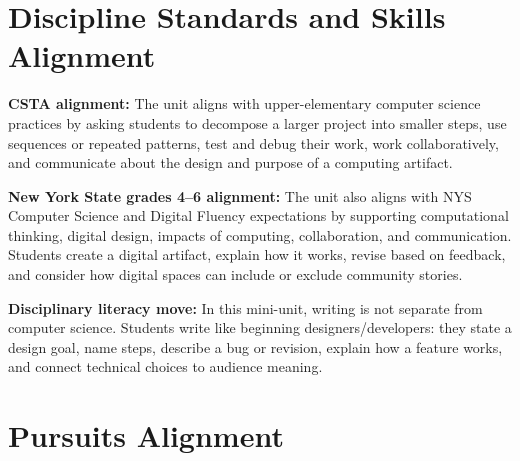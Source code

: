 \section*{Discipline Standards and Skills Alignment}

\textcolor{LessonTwoAccent}{\textbf{CSTA alignment:} The unit aligns with upper-elementary computer science practices by asking students to decompose a larger project into smaller steps, use sequences or repeated patterns, test and debug their work, work collaboratively, and communicate about the design and purpose of a computing artifact.}

\textcolor{LessonTwoAccent}{\textbf{New York State grades 4--6 alignment:} The unit also aligns with NYS Computer Science and Digital Fluency expectations by supporting computational thinking, digital design, impacts of computing, collaboration, and communication. Students create a digital artifact, explain how it works, revise based on feedback, and consider how digital spaces can include or exclude community stories.}

\textcolor{LessonTwoAccent}{\textbf{Disciplinary literacy move:} In this mini-unit, writing is not separate from computer science. Students write like beginning designers/developers: they state a design goal, name steps, describe a bug or revision, explain how a feature works, and connect technical choices to audience meaning.}

\section*{Pursuits Alignment}

